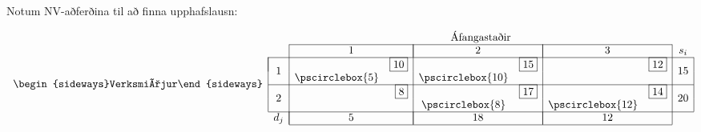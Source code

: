 \begin{samepage}
\begin{lausn} Notum NV-aðferðina til að finna upphafslausn:
\begin{center}
\[ \begin{array}{cccr|cr|crcc}
 & & \multicolumn{6}{c}{\mbox{Áfangastaðir}} \\ \cline{3-8}
 & & \multicolumn{2}{|c|}{1} & \multicolumn{2}{|c|}{2} & \multicolumn{2}{|c|}{3} & s_i \\ \cline{2-9}
\multicolumn{1}{c|}{\multirow{4}{*}{\begin{sideways}Verksmiðjur\end{sideways}}} 
& \multicolumn{1}{|c|}{\multirow{2}{*}{1}} &   & \scriptscriptstyle{\fbox{10}}&    & \scriptscriptstyle{\fbox{15}} & & \scriptscriptstyle{\fbox{12}} & \multicolumn{1}{|c|}{\multirow{2}{*}{15}} \\ 
& \multicolumn{1}{|c|}{                  } & \pscirclebox{5} &    & \pscirclebox{10} &    & &    & \multicolumn{1}{|c|}{}\\ \cline{2-9}
& \multicolumn{1}{|c|}{\multirow{2}{*}{2}} &   & \scriptscriptstyle{\fbox{8}}&    & \scriptscriptstyle{\fbox{17}} &  & \scriptscriptstyle{\fbox{14}} & \multicolumn{1}{|c|}{\multirow{2}{*}{20}} \\ 
& \multicolumn{1}{|c|}{                  } &   &    & \pscirclebox{8} &    & \pscirclebox{12}&    & \multicolumn{1}{|c|}{}\\ \cline{2-9}
&  \multicolumn{1}{c|}{d_j}& \multicolumn{2}{|c|}{5} & \multicolumn{2}{|c|}{18} & \multicolumn{2}{|c|}{12} & \\ \cline{3-8}
\end{array}
\]
\end{center}
\end{lausn}
\end{samepage}

